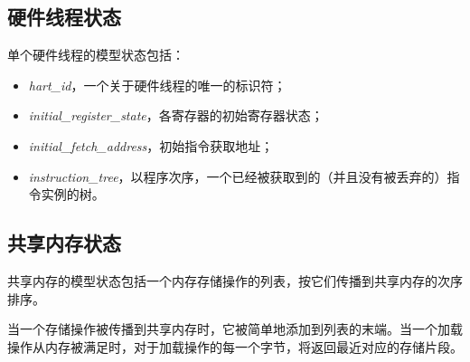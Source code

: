 \subsection{硬件线程状态}
单个硬件线程的模型状态包括：
\begin{itemize}
\item {\it hart\_id}，一个关于硬件线程的唯一的标识符； %
\item {\it initial\_register\_state}，各寄存器的初始寄存器状态；  %
\item {\it initial\_fetch\_address}，初始指令获取地址； %
\item {\it instruction\_tree}，以程序次序，一个已经被获取到的（并且没有被丢弃的）指令实例的树。 %
\end{itemize}


\subsection{共享内存状态}
共享内存的模型状态包括一个内存存储操作的列表，按它们传播到共享内存的次序排序。

当一个存储操作被传播到共享内存时，它被简单地添加到列表的末端。当一个加载操作从内存被满足时，对于加载操作的每一个字节，将返回最近对应的存储片段。

